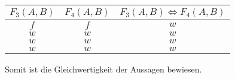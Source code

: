\begin{enumerate}[a)]
\begin{table*}[h]
\begin{minipage}{1\linewidth}
            \centering
            \begin{tabular}{|c|c|c|}
                \hline
                $F_3(A, B)$ & $F_4(A, B)$ & $F_3(A, B) \Leftrightarrow F_4(A, B)$ \\
                \hline
                $f$ & $f$ & $w$ \\
                \hline
                $w$ & $w$ & $w$ \\
                \hline
                $w$ & $w$ & $w$ \\
                \hline
                $w$ & $w$ & $w$ \\
                \hline
            \end{tabular}
        \end{minipage}
    \end{table*}
\end{enumerate}
Somit ist die Gleichwertigkeit der Aussagen bewiesen.
